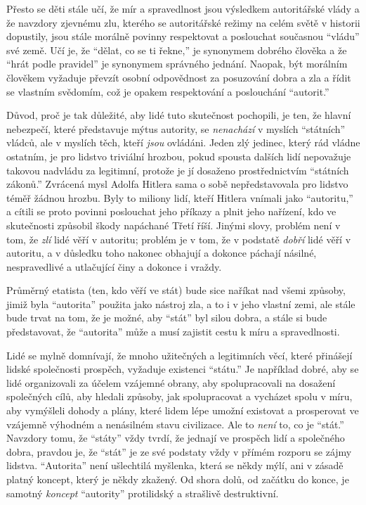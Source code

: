 \documentclass{book}
\begin{document}
Přesto se děti stále učí, že mír a spravedlnost jsou výsledkem autoritářské vlády a že navzdory zjevnému zlu, kterého se autoritářské režimy na celém světě v historii dopustily, jsou stále morálně povinny respektovat a poslouchat současnou \enquote{vládu} své země. Učí je, že \enquote{dělat, co se ti řekne,} je synonymem dobrého člověka a že \enquote{hrát podle pravidel} je synonymem správného jednání. Naopak, být morálním člověkem vyžaduje převzít osobní odpovědnost za posuzování dobra a zla a řídit se vlastním svědomím, což je opakem respektování a poslouchání \enquote{autorit.}

Důvod, proč je tak důležité, aby lidé tuto skutečnost pochopili, je ten, že hlavní nebezpečí, které představuje mýtus autority, se \emph{nenachází} v myslích \enquote{státních} vládců, ale v myslích těch, kteří \emph{jsou} ovládáni. Jeden zlý jedinec, který rád vládne ostatním, je pro lidstvo triviální hrozbou, pokud spousta dalších lidí nepovažuje takovou nadvládu za legitimní, protože je jí dosaženo prostřednictvím \enquote{státních zákonů.} Zvrácená mysl Adolfa Hitlera sama o sobě nepředstavovala pro lidstvo téměř žádnou hrozbu. Byly to miliony lidí, kteří Hitlera vnímali jako \enquote{autoritu,} a cítili se proto povinni poslouchat jeho příkazy a plnit jeho nařízení, kdo ve skutečnosti způsobil škody napáchané Třetí říší. Jinými slovy, problém není v tom, že \emph{zlí} lidé věří v autoritu; problém je v tom, že v podstatě \emph{dobří} lidé věří v autoritu, a v důsledku toho nakonec obhajují a dokonce páchají násilné, nespravedlivé a utlačující činy a dokonce i vraždy.

Průměrný etatista (ten, kdo věří ve stát) bude sice naříkat nad všemi způsoby, jimiž byla \enquote{autorita} použita jako nástroj zla, a to i v jeho vlastní zemi, ale stále bude trvat na tom, že je možné, aby \enquote{stát} byl silou dobra, a stále si bude představovat, že \enquote{autorita} může a musí zajistit cestu k míru a spravedlnosti.

Lidé se mylně domnívají, že mnoho užitečných a legitimních věcí, které přinášejí lidské společnosti prospěch, vyžaduje existenci \enquote{státu.} Je například dobré, aby se lidé organizovali za účelem vzájemné obrany, aby spolupracovali na dosažení společných cílů, aby hledali způsoby, jak spolupracovat a vycházet spolu v míru, aby vymýšleli dohody a plány, které lidem lépe umožní existovat a prosperovat ve vzájemně výhodném a nenásilném stavu civilizace. Ale to \emph{není} to, co je \enquote{stát.} Navzdory tomu, že \enquote{státy} vždy tvrdí, že jednají ve prospěch lidí a společného dobra, pravdou je, že \enquote{stát} je ze své podstaty vždy v přímém rozporu se zájmy lidstva. \enquote{Autorita} není ušlechtilá myšlenka, která se někdy mýlí, ani v zásadě platný koncept, který je někdy zkažený. Od shora dolů, od začátku do konce, je samotný \emph{koncept} \enquote{autority} protilidský a strašlivě destruktivní.
\end{document}
